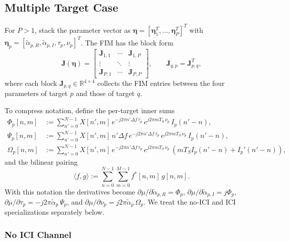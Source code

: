 \documentclass[11pt]{article}
\begin{document}
\subsection{Multiple Target Case}

For \(P>1\), stack the parameter vector as \(\bm{\eta} = [\bm{\eta}_1^T, \ldots, \bm{\eta}_P^T]^T\) with \(\bm{\eta}_p = [\tilde{\alpha}_{p,R}, \tilde{\alpha}_{p,I}, \tau_p, \nu_p]^T\). The FIM has the block form
\begin{equation}
    \bm{J}(\bm{\eta}) = \begin{bmatrix} \bm{J}_{1,1} & \cdots & \bm{J}_{1,P} \\ \vdots & \ddots & \vdots \\ \bm{J}_{P,1} & \cdots & \bm{J}_{P,P} \end{bmatrix}, \qquad \bm{J}_{q,p} = \bm{J}_{p,q}^T,
\end{equation}
where each block \(\bm{J}_{p,q} \in \mathbb{R}^{4\times 4}\) collects the FIM entries between the four parameters of target \(p\) and those of target \(q\).

To compress notation, define the per-target inner sums
\begin{align}
    \Phi_p[n,m]   &:= \sum_{n'=0}^{N-1} X[n',m]\, e^{-j2\pi n'\Delta f\, \tau_p}\, e^{j2\pi mT_S\, \nu_p}\, I_p(n'-n), \\
    \Psi_p[n,m]   &:= \sum_{n'=0}^{N-1} X[n',m]\, n'\Delta f\, e^{-j2\pi n'\Delta f\, \tau_p}\, e^{j2\pi mT_S\, \nu_p}\, I_p(n'-n), \\
    \Omega_p[n,m] &:= \sum_{n'=0}^{N-1} X[n',m]\, e^{-j2\pi n'\Delta f\, \tau_p}\, e^{j2\pi mT_S\, \nu_p}\, \left( mT_S I_p(n'-n) + I_p'(n'-n) \right),
\end{align}
and the bilinear pairing
\begin{equation}
    \langle f, g \rangle := \sum_{n=0}^{N-1} \sum_{m=0}^{M-1} f^*[n,m]\, g[n,m].
\end{equation}
With this notation the derivatives become \(\partial \mu / \partial \tilde{\alpha}_{p,R} = \Phi_p\), \(\partial \mu / \partial \tilde{\alpha}_{p,I} = j\Phi_p\), \(\partial \mu / \partial \tau_p = -j2\pi \tilde{\alpha}_p\, \Psi_p\), and \(\partial \mu / \partial \nu_p = j2\pi \tilde{\alpha}_p\, \Omega_p\). We treat the no-ICI and ICI specializations separately below.

\subsubsection{No ICI Channel}
\end{document}
